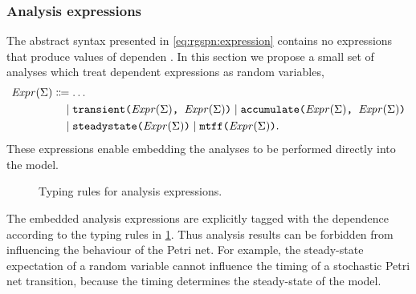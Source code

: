 \subsubsection{Analysis expressions}

The abstract syntax presented in \cref{eq:rgspn:expression} contains no expressions that produce values of dependen . In this section we propose a small set of analyses which treat  dependent expressions as random variables,
\begin{equation}
  \begin{aligned}
    \ebnfV{\rel{Expr}(\Sigma)} &\ebnfEq \ldots \\
    &\ebnfCont \lit{transient(\(\ebnfV{\rel{Expr}(\Sigma)}\), \(\ebnfV{\rel{Expr}(\Sigma)}\))} \mid \lit{accumulate(\(\ebnfV{\rel{Expr}(\Sigma)}\), \(\ebnfV{\rel{Expr}(\Sigma)}\))} \\
    &\ebnfCont \lit{steadystate(\(\ebnfV{\rel{Expr}(\Sigma)}\))} \mid \lit{mtff(\(\ebnfV{\rel{Expr}(\Sigma)}\))} \text.
  \end{aligned}
\end{equation}
These expressions enable embedding the analyses to be performed directly into the  model.

\begin{figure}
  \caption{Typing rules for analysis expressions.}
  \label{fig:rgspn:analysis-typing}
\end{figure}

The embedded analysis expressions are explicitly tagged with the  dependence according to the typing rules in \cref{fig:rgspn:analysis-typing}. Thus analysis results can be forbidden from influencing the behaviour of the Petri net. For example, the steady-state expectation of a random variable cannot influence the timing of a stochastic Petri net transition, because the timing determines the steady-state of the model.

